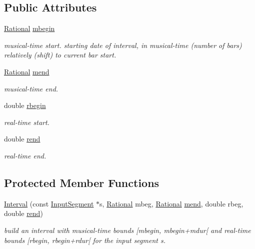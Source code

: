 \subsection*{Public Attributes}
\begin{DoxyCompactItemize}
\item 
\mbox{\label{classInterval_a6c8385bc5875cb761827f9e75f783834}} 
\mbox{\hyperlink{classRational}{Rational}} \mbox{\hyperlink{classInterval_a6c8385bc5875cb761827f9e75f783834}{mbegin}}
\begin{DoxyCompactList}\small\item\em musical-\/time start. starting date of interval, in musical-\/time (number of bars) relatively (shift) to current bar start. \end{DoxyCompactList}\item 
\mbox{\hyperlink{classRational}{Rational}} \mbox{\hyperlink{classInterval_a963b9b36f085a7db9c159c55608f8408}{mend}}
\begin{DoxyCompactList}\small\item\em musical-\/time end. \end{DoxyCompactList}\item 
double \mbox{\hyperlink{classInterval_aa17f339b42a23f6afc188971e7003d84}{rbegin}}
\begin{DoxyCompactList}\small\item\em real-\/time start. \end{DoxyCompactList}\item 
double \mbox{\hyperlink{classInterval_a1acb3128311a318b23e68cc8ca0182e9}{rend}}
\begin{DoxyCompactList}\small\item\em real-\/time end. \end{DoxyCompactList}\end{DoxyCompactItemize}
\subsection*{Protected Member Functions}
\begin{DoxyCompactItemize}
\item 
\mbox{\hyperlink{group__segment_gaefc21b7c838661c05286304f6d891690}{Interval}} (const \mbox{\hyperlink{classInputSegment}{Input\+Segment}} $\ast$s, \mbox{\hyperlink{classRational}{Rational}} mbeg, \mbox{\hyperlink{classRational}{Rational}} \mbox{\hyperlink{classInterval_a963b9b36f085a7db9c159c55608f8408}{mend}}, double rbeg, double \mbox{\hyperlink{classInterval_a1acb3128311a318b23e68cc8ca0182e9}{rend}})
\begin{DoxyCompactList}\small\item\em build an interval with musical-\/time bounds \mbox{[}mbegin, mbegin+mdur\mbox{[} and real-\/time bounds \mbox{[}rbegin, rbegin+rdur\mbox{[} for the input segment s. \end{DoxyCompactList}\end{DoxyCompactItemize}
